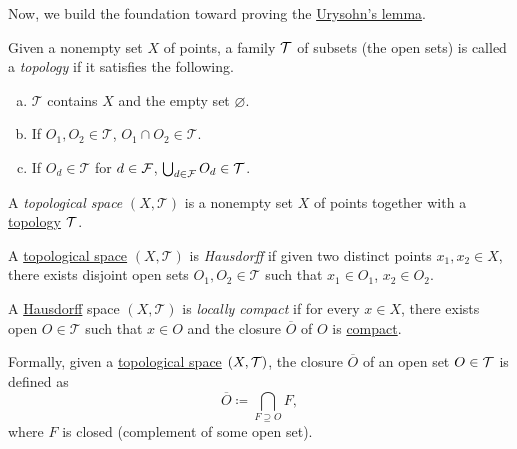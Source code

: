 Now, we build the foundation toward proving the \hyperref[thm:Urysohn-lemma]{Urysohn's lemma}.

\begin{definition}[Topology]\label{def:topology}
	Given a nonempty set \(X\) of points, a family \(\mathcal{\MakeUppercase{t}} \) of subsets (the open sets) is called a \emph{topology} if it satisfies the following.
	\begin{enumerate}[(a)]
		\item \(\mathcal{T} \) contains \(X\) and the empty set \(\varnothing \).
		\item If \(O_1, O_2 \in \mathcal{T} \), \(O_1 \cap O_2\in \mathcal{T} \).
		\item If \(O_d \in \mathcal{T} \) for \(d\in \mathcal{\MakeUppercase{f}}\), \(\bigcup_{d\in \mathcal{\MakeUppercase{f}} } O_d \in \mathcal{T} \).
	\end{enumerate}
\end{definition}

\begin{definition}\label{def:topological-space}
	A \emph{topological space} \((X, \mathcal{T})\) is a nonempty set \(X\) of points together with a \hyperref[def:topology]{topology} \(\mathcal{\MakeUppercase{T}}\).
\end{definition}

\begin{definition}[Hausdorff]\label{def:Hausdorff}
	A \hyperref[def:topological-space]{topological space} \((X, \mathcal{T})\) is \emph{Hausdorff} if given two distinct points \(x_1, x_2\in X\), there exists disjoint open sets \(O_1, O_2\in \mathcal{T} \) such that \(x_1\in O_1\), \(x_2\in O_2\).
\end{definition}

\begin{definition}\label{def:locally-compact}
	A \hyperref[def:Hausdorff]{Hausdorff} space \((X, \mathcal{T})\) is \emph{locally compact} if for every \(x\in X\), there exists open \(O\in \mathcal{T} \) such that \(x\in O\) and the closure \(\overline{O} \) of \(O\) is \hyperref[def:compact]{compact}.
\end{definition}

\begin{remark}[Closure]
	Formally, given a \hyperref[def:topological-space]{topological space} \((X, \mathcal{\MakeUppercase{t}} )\), the closure \(\overline{O} \) of an open set \(O\in \mathcal{\MakeUppercase{t}} \) is defined as
	\[
		\overline{O} \coloneqq \bigcap_{F \supseteq O} F,
	\]
	where \(F\) is closed (complement of some open set).
\end{remark}

